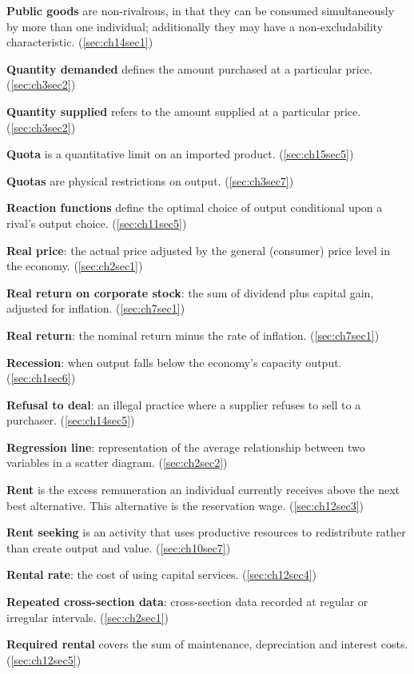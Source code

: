 \textbf{Public goods} are non-rivalrous, in that they can be consumed simultaneously by more than one individual; additionally they may have a non-excludability characteristic. (\ref{sec:ch14sec1})

\textbf{Quantity demanded} defines the amount purchased at a particular price. (\ref{sec:ch3sec2})

\textbf{Quantity supplied} refers to the amount supplied at a particular price. (\ref{sec:ch3sec2})

\textbf{Quota} is a quantitative limit on an imported product. (\ref{sec:ch15sec5})

\textbf{Quotas} are physical restrictions on output. (\ref{sec:ch3sec7})

\textbf{Reaction functions} define the optimal choice of output conditional upon a rival's output choice. (\ref{sec:ch11sec5})

\textbf{Real price}: the actual price adjusted by the general (consumer) price level in the economy. (\ref{sec:ch2sec1})

\textbf{Real return on corporate stock}: the sum of dividend plus capital gain, adjusted for inflation. (\ref{sec:ch7sec1})

\textbf{Real return}: the nominal return minus the rate of inflation. (\ref{sec:ch7sec1})

\textbf{Recession}: when output falls below the economy's capacity output. (\ref{sec:ch1sec6})

\textbf{Refusal to deal}: an illegal practice where a supplier refuses to sell to a purchaser. (\ref{sec:ch14sec5})

\textbf{Regression line}: representation of the average relationship between two variables in a scatter diagram. (\ref{sec:ch2sec2})

\textbf{Rent} is the excess remuneration an individual currently receives above the next best alternative. This alternative is the reservation wage. (\ref{sec:ch12sec3})

\textbf{Rent seeking} is an activity that uses productive resources to redistribute rather than create output and value. (\ref{sec:ch10sec7})

\textbf{Rental rate}: the cost of using capital services. (\ref{sec:ch12sec4})

\textbf{Repeated cross-section data}: cross-section data recorded at regular or irregular intervals. (\ref{sec:ch2sec1})

\textbf{Required rental} covers the sum of maintenance, depreciation and interest costs. (\ref{sec:ch12sec5})

